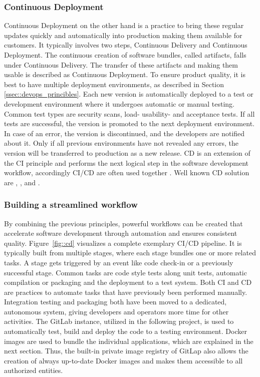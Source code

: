 \documentclass[12pt, a4paper]{article}
\begin{document}
        \subsubsection{Continuous Deployment}
        Continuous Deployment on the other hand is a practice to bring these regular updates quickly and automatically into production making them available for customers. It typically involves two steps, Continuous Delivery and Continuous Deployment. The continuous creation of software bundles, called artifacts, falls under Continuous Delivery. The transfer of these artifacts and making them usable is described as Continuous Deployment. To ensure product quality, it is best to have multiple deployment environments, as described in Section \ref{ssec::devops_princibles}. Each new version is automatically deployed to a test or development environment where it undergoes automatic or manual testing. Common test types are security scans, load- usability- and acceptance tests. If all tests are successful, the version is promoted to the next deployment environment. In case of an error, the version is discontinued, and the developers are notified about it. Only if all previous environments have not revealed any errors, the version will be transferred to production as a new release. \ac{CD} is an extension of the \ac{CI} principle and performs the next logical step in the software development workflow, accordingly \ac{CI}/\ac{CD} are often used together \cite{azuredevops}. Well known \ac{CD} solution are , ,  and .

        \subsubsection{Building a streamlined workflow}
        By combining the previous principles, powerful workflows can be created that accelerate software development through automation and ensures consistent quality. Figure~\ref{fig::cd} visualizes a complete exemplary \ac{CI}/\ac{CD} pipeline. It is typically built from multiple stages, where each stage bundles one or more related tasks. A stage gets triggered by an event like code check-in or a previously successful stage. Common tasks are code style tests along unit tests, automatic compilation or packaging and the deployment to a test system.\newline
        Both \ac{CI} and \ac{CD} are practices to automate tasks that have previously been performed manually. Integration testing and packaging both have been moved to a dedicated, autonomous system, giving developers and operators more time for other activities.\newline
        The GitLab instance, utilized in the following project, is used to automatically test, build and deploy the code to a testing environment. Docker images are used to bundle the individual applications, which are explained in the next section. Thus, the built-in private image registry of GitLap also allows the creation of always up-to-date Docker images and makes them accessible to all authorized entities.
        
\end{document}
